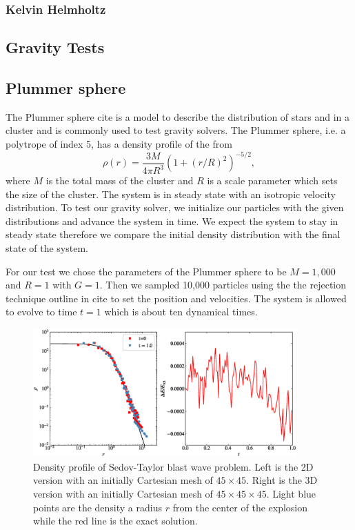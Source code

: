 \subsubsection{Kelvin Helmholtz}

\subsection{Gravity Tests}
\subsection{Plummer sphere}
The Plummer sphere cite is a model to describe the distribution of stars and in a cluster
and is commonly used to test gravity solvers. The Plummer sphere, i.e. a polytrope of index 5,
has a density profile of the from
\begin{equation}
	\rho (r) = \frac{3 M}{4\pi R^3} \left(1 + (r/R)^2\right)^{-5/2},
\end{equation}
where $M$ is the total mass of the cluster and $R$ is a scale parameter which sets the
size of the cluster. The system is in steady state with an isotropic velocity distribution.
To test our gravity solver, we initialize our particles with the given distributions and
advance the system in time. We expect the system to stay in steady state therefore we compare
the initial density distribution with the final state of the system.

For our test we chose the parameters of the Plummer sphere to be $M=1,000$ and $R=1$ with
$G=1$. Then we sampled 10,000 particles using the the rejection technique outline in
cite to set the position and velocities. The system is allowed to evolve to time $t=1$
which is about ten dynamical times.
\begin{figure}
    \begin{center}
        \includegraphics[width=0.9\textwidth]{figures/plummer.eps}
        \caption{Density profile of Sedov-Taylor blast wave problem. Left is the 2D version with an initially
        Cartesian mesh of $45 \times 45$. Right is the 3D version with an initially Cartesian mesh of 
        $45 \times 45 \times 45$. Light blue points are the density a radius $r$ from the center of the explosion
        while the red line is the exact solution.}
        \label{fig.sedov_panel}
    \end{center}
\end{figure}

